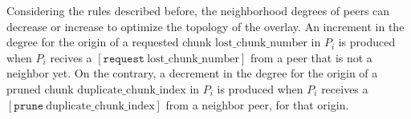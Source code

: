 Considering the rules described before, the neighborhood degrees of
peers can decrease or increase to optimize the topology of the
overlay. An increment in the degree for the origin of a requested
chunk $\text{lost\_chunk\_number}$ in $P_i$ is produced when $P_i$
recives a $[\mathtt{request}~\text{lost\_chunk\_number}]$ from a peer
that is not a neighbor yet. On the contrary, a decrement in the degree
for the origin of a pruned chunk $\text{duplicate\_chunk\_index}$ in
$P_i$ is produced when $P_i$ receives a
$[\mathtt{prune}~\text{duplicate\_chunk\_index}]$ from a neighbor
peer, for that origin.
